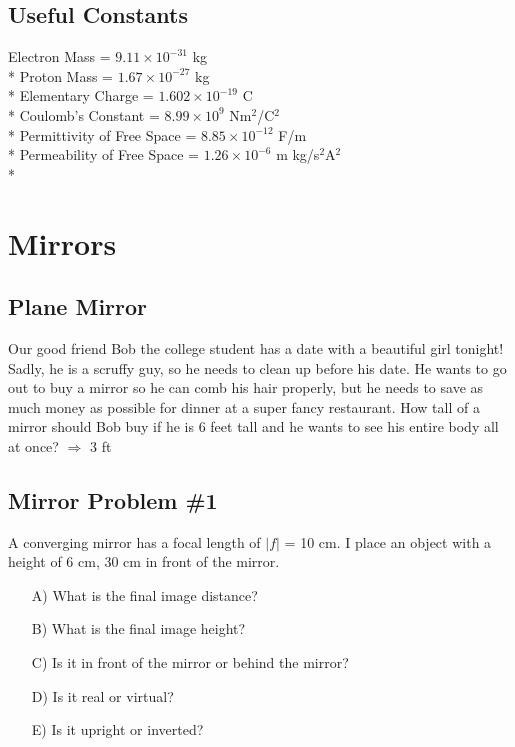 \documentclass[11pt]{article}
\begin{document}
\maketitle
\tableofcontents
\hspace{30mm}

\subsection*{Useful Constants}
Electron Mass = $9.11 \times 10^{-31}$ kg \\*
Proton Mass = $1.67 \times 10^{-27}$ kg \\*
Elementary Charge = $1.602 \times 10^{-19}$ C \\*
Coulomb's Constant = $8.99 \times 10^9$ Nm$^2$/C$^2$ \\*
Permittivity of Free Space = $8.85 \times 10^{-12}$ F/m \\*
Permeability of Free Space = $1.26 \times 10^{-6}$ m kg/s$^2$A$^2$ \\*


\pagebreak
\section{Mirrors}

\subsection{Plane Mirror}
Our good friend Bob the college student has a date with a beautiful girl tonight!  Sadly, he is a scruffy guy, so he needs to clean up before his date.  He wants to go out to buy a mirror so he can comb his hair properly, but he needs to save as much money as possible for dinner at a super fancy restaurant.  How tall of a mirror should Bob buy if he is 6 feet tall and he wants to see his entire body all at once?
$\Rightarrow$ 3 ft

\subsection{Mirror Problem \#1}
A converging mirror has a focal length of $|f|$ = 10 cm.  I place an object with a height of 6 cm, 30 cm in front of the mirror.  

\begin{itemize}
\item[A)] What is the final image distance?
\item[B)] What is the final image height?
\item[C)] Is it in front of the mirror or behind the mirror?  
\item[D)] Is it real or virtual?
\item[E)] Is it upright or inverted?
\end{itemize}
\end{document}
